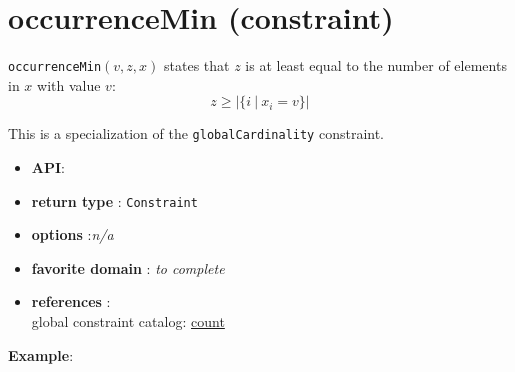 \label{occurrencemin}
\hypertarget{occurrencemin}{}

\section{occurrenceMin (constraint)}\label{occurrencemin:occurrenceminconstraint}\hypertarget{occurrencemin:occurrenceminconstraint}{}
\begin{notedef}
  \texttt{occurrenceMin}$(v,z,x)$ states that $z$ is at least equal to the number of elements in $x$ with value $v$:
$$z\ge|\{i\ |\ x_i=v\}|$$   
\end{notedef}
  This is a specialization of the \texttt{globalCardinality} constraint.

\begin{itemize}
	\item \textbf{API}: 
	\item \textbf{return type} : \texttt{Constraint}
	\item \textbf{options} :\emph{n/a}
	\item \textbf{favorite domain} : \emph{to complete}
	\item \textbf{references} :\\
      global constraint catalog: \href{http://www.emn.fr/x-info/sdemasse/gccat/Ccount.html}{count}
\end{itemize}

\textbf{Example}:
